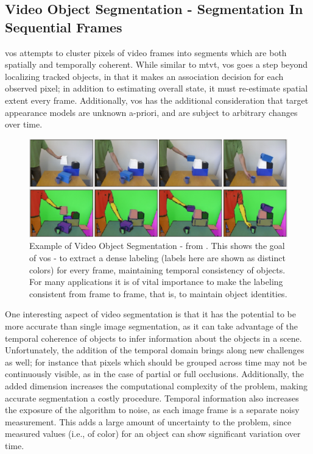 \subsection{Video Object Segmentation - Segmentation In Sequential Frames}
\gls{vos} attempts to cluster pixels of video frames into segments which are both spatially and temporally coherent. While similar to \gls{mtvt}, \gls{vos} goes a step beyond localizing tracked objects, in that it makes an association decision for each observed pixel; in addition to estimating overall state, it must re-estimate spatial extent every frame. Additionally, \gls{vos} has the additional consideration that target appearance models are unknown a-priori, and are subject to arbitrary changes over time. 

\begin{figure}
\label{fig:ExampleSegmentation}
\centering
\includegraphics[width=\linewidth]{figures/Introduction/Video_Segmentation.pdf}
\caption[Example of Video Object Segmentation]{Example of Video Object Segmentation - from \cite{Abramov_WACV12}. This shows the goal of \gls{vos} - to extract a dense labeling (labels here are shown as distinct colors) for every frame, maintaining temporal consistency of objects. For many applications it is of vital importance to make the labeling consistent from frame to frame, that is, to maintain object identities.}
\end{figure}

One interesting aspect of video segmentation is that it has the potential to be more accurate than single image segmentation, as it can take advantage of the temporal coherence of objects to infer information about the objects in a scene. Unfortunately, the addition of the temporal domain brings along new challenges as well; for instance that pixels which should be grouped across time may not be continuously visible, as in the case of partial or full occlusions. Additionally, the added dimension increases the computational complexity of the problem, making accurate segmentation a costly procedure. Temporal information also increases the exposure of the algorithm to noise, as each image frame is a separate noisy measurement. This adds a large amount of uncertainty to the problem, since measured values (i.e., of color) for an object can show significant variation over time. 
 
